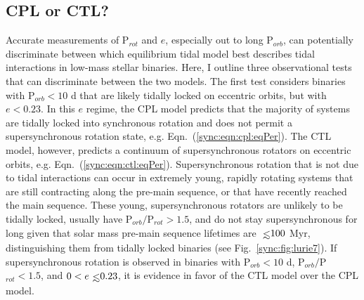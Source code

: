 

\subsection{CPL or CTL?} \label{sync:sec:whichModel}

Accurate measurements of P$_{rot}$ and $e$, especially out to long P$_{orb}$, can potentially discriminate between which equilibrium tidal model best describes tidal interactions in low-mass stellar binaries. Here, I outline three observational tests that can discriminate between the two models. The first test considers binaries with P$_{orb} < 10$ d that are likely tidally locked on eccentric orbits, but with $e < 0.23$.  In this $e$ regime, the CPL model predicts that the majority of systems are tidally locked into synchronous rotation and does not permit a supersynchronous rotation state, e.g. Eqn.~(\ref{sync:eqn:cpl:eqPer}). The CTL model, however, predicts a continuum of supersynchronous rotators on eccentric orbits, e.g. Eqn.~(\ref{sync:eqn:ctl:eqPer}). Supersynchronous rotation that is not due to tidal interactions can occur in extremely young, rapidly rotating systems that are still contracting along the pre-main sequence, or that have recently reached the main sequence.  These young, supersynchronous rotators are unlikely to be tidally locked, usually have P$_{orb}/$P$_{rot} > 1.5$, and do not stay supersynchronous for long given that solar mass pre-main sequence lifetimes are $\lsim 100$ Myr, distinguishing them from tidally locked binaries (see Fig.~\ref{sync:fig:lurie7}).   If supersynchronous rotation is observed in binaries with P$_{orb} < 10$ d, P$_{orb}/$P$_{rot} < 1.5$, and $0 < e \lsim 0.23$, it is evidence in favor of the CTL model over the CPL model. 

